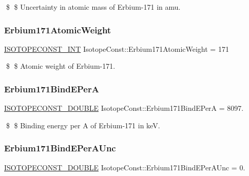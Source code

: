 \$ \$ Uncertainty in atomic mass of Erbium-\/171 in amu. \mbox{\label{group___isotope_const-_erbium-_er171_ga37a0f030edaa848f0267e7bf0e2ab554}} 
\subsubsection{\texorpdfstring{Erbium171\+Atomic\+Weight}{Erbium171AtomicWeight}}
{\footnotesize\ttfamily \mbox{\hyperlink{group___isotope_const-_macros_ga5f18360b3e99483a35c32d789e62621c}{I\+S\+O\+T\+O\+P\+E\+C\+O\+N\+S\+T\+\_\+\+I\+NT}} Isotope\+Const\+::\+Erbium171\+Atomic\+Weight = 171}

\$ \$ Atomic weight of Erbium-\/171. \mbox{\label{group___isotope_const-_erbium-_er171_ga842c6dde3ba4c5fee23df099a1e6ff99}} 
\subsubsection{\texorpdfstring{Erbium171\+Bind\+E\+PerA}{Erbium171BindEPerA}}
{\footnotesize\ttfamily \mbox{\hyperlink{group___isotope_const-_macros_ga8f45a7272ce02c0b4c65c44636ed719a}{I\+S\+O\+T\+O\+P\+E\+C\+O\+N\+S\+T\+\_\+\+D\+O\+U\+B\+LE}} Isotope\+Const\+::\+Erbium171\+Bind\+E\+PerA = 8097.}

\$ \$ Binding energy per A of Erbium-\/171 in keV. \mbox{\label{group___isotope_const-_erbium-_er171_ga462e45c0f5222aec4da5e636abcb345c}} 
\subsubsection{\texorpdfstring{Erbium171\+Bind\+E\+Per\+A\+Unc}{Erbium171BindEPerAUnc}}
{\footnotesize\ttfamily \mbox{\hyperlink{group___isotope_const-_macros_ga8f45a7272ce02c0b4c65c44636ed719a}{I\+S\+O\+T\+O\+P\+E\+C\+O\+N\+S\+T\+\_\+\+D\+O\+U\+B\+LE}} Isotope\+Const\+::\+Erbium171\+Bind\+E\+Per\+A\+Unc = 0.}

